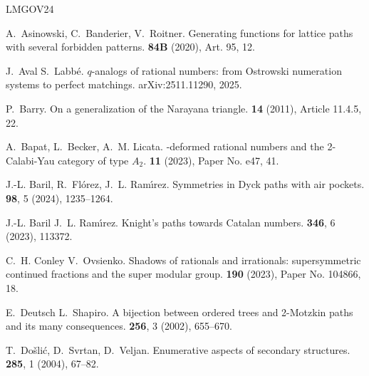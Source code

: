 \documentclass[11pt,reqno]{amsart}
\theoremstyle{plain}
\theoremstyle{definition}
\numberwithin{figure}{section}
\numberwithin{table}{section}
\numberwithin{equation}{section}
\begin{document}
\begin{thebibliography}{LMGOV24}

A.~\bgroup\sc Asinowski\egroup{}, C.~\bgroup\sc Banderier\egroup{}, \andname{}
  V.~\bgroup\sc Roitner\egroup{}.
\newblock Generating functions for lattice paths with several forbidden
  patterns.
 {\bf 84B} (2020), Art. 95, 12.

J.~\bgroup\sc Aval\egroup{} \andname{} S.~\bgroup\sc Labb{\'e}\egroup{}.
\newblock $q$-analogs of rational numbers: from Ostrowski numeration systems to
  perfect matchings.
\newblock arXiv{\string:}2511.11290, 2025.

P.~\bgroup\sc Barry\egroup{}.
\newblock On a generalization of the {N}arayana triangle.
 {\bf 14} (2011), Article 11.4.5, 22.

A.~\bgroup\sc Bapat\egroup{}, L.~\bgroup\sc Becker\egroup{}, \andname{} A.~M.
  \bgroup\sc Licata\egroup{}.
-deformed rational numbers and the 2-{C}alabi-{Y}au category of
  type {$A_2$}.
 {\bf 11} (2023), Paper No. e47, 41.

J.-L. \bgroup\sc Baril\egroup{}, R.~\bgroup\sc Fl{\'o}rez\egroup{}, \andname{}
  J.~L. \bgroup\sc Ram{\'\i}rez\egroup{}.
\newblock Symmetries in Dyck paths with air pockets.
 {\bf 98}, 5 (2024), 1235--1264.

J.-L. \bgroup\sc Baril\egroup{} \andname{} J.~L. \bgroup\sc
  Ram{\'\i}rez\egroup{}.
\newblock Knight's paths towards Catalan numbers.
 {\bf 346}, 6 (2023), 113372.

C.~H. \bgroup\sc Conley\egroup{} \andname{} V.~\bgroup\sc Ovsienko\egroup{}.
\newblock Shadows of rationals and irrationals: supersymmetric continued
  fractions and the super modular group.
 {\bf 190} (2023), Paper No. 104866, 18.

E.~\bgroup\sc Deutsch\egroup{} \andname{} L.~\bgroup\sc Shapiro\egroup{}.
\newblock A bijection between ordered trees and 2-Motzkin paths and its many
  consequences.
 {\bf 256}, 3 (2002), 655--670.

T.~\bgroup\sc Do{\v{s}}li{\'c}\egroup{}, D.~\bgroup\sc Svrtan\egroup{},
  \andname{} D.~\bgroup\sc Veljan\egroup{}.
\newblock Enumerative aspects of secondary structures.
 {\bf 285}, 1 (2004), 67--82.


\end{thebibliography}
\end{document}
